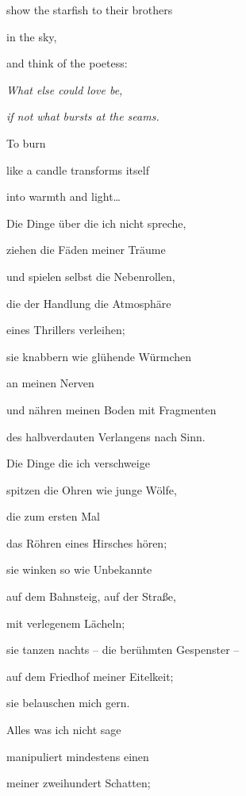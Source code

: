 show the starfish to their brothers

in the sky,


\bigskip

and think of the poetess:

\emph{
What else could love be,}

\emph{
if not what bursts at the seams.}


\bigskip

To burn

like a candle transforms itself

into warmth and light…


\bigskip


\bigskip



\bigskip


\bigskip

Die Dinge über die ich nicht spreche, 

ziehen die Fäden meiner Träume

und spielen selbst die Nebenrollen,

die der Handlung die Atmosphäre

eines Thrillers verleihen;

sie knabbern wie glühende Würmchen 

an meinen Nerven

und nähren meinen Boden mit Fragmenten

des halbverdauten Verlangens nach Sinn.


\bigskip

Die Dinge die ich verschweige

spitzen die Ohren wie junge Wölfe,

die zum ersten Mal 

das Röhren eines Hirsches hören;

sie winken so wie Unbekannte

auf dem Bahnsteig, auf der Straße, 

mit verlegenem Lächeln;

sie tanzen nachts -- die berühmten Gespenster --

auf dem Friedhof meiner Eitelkeit;

sie belauschen mich gern.


\bigskip

Alles was ich nicht sage

manipuliert mindestens einen

meiner zweihundert Schatten;


